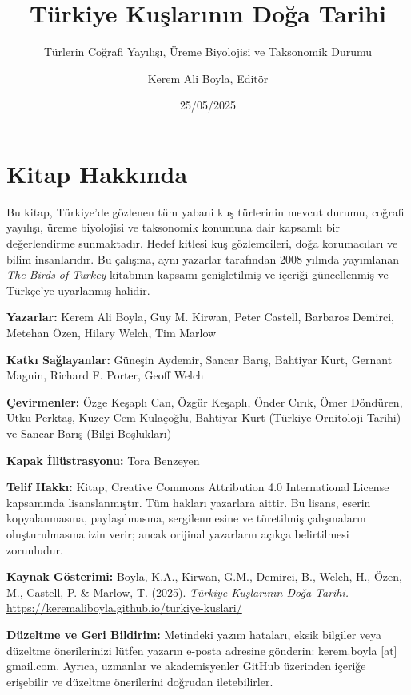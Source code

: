 \documentclass[
  10.5pt,
  a4paper,
  DIV=11,
  numbers=noendperiod,
  twocolumn]{scrreprt}
\title{Türkiye Kuşlarının Doğa Tarihi}
\subtitle{Türlerin Coğrafi Yayılışı, Üreme Biyolojisi ve Taksonomik
Durumu}
\author{Kerem Ali Boyla, Editör}
\date{25/05/2025}
\renewcommand*\contentsname{İçindekiler}
\newcommand\contentsname{İçindekiler}
\begin{document}
\maketitle

\renewcommand*\contentsname{İçindekiler}
{
\hypersetup{linkcolor=}
\setcounter{tocdepth}{2}
\tableofcontents
}


\chapter*{Kitap Hakkında}\label{kitap-hakkux131nda}


Bu kitap, Türkiye'de gözlenen tüm yabani kuş türlerinin mevcut durumu,
coğrafi yayılışı, üreme biyolojisi ve taksonomik konumuna dair kapsamlı
bir değerlendirme sunmaktadır. Hedef kitlesi kuş gözlemcileri, doğa
korumacıları ve bilim insanlarıdır. Bu çalışma, aynı yazarlar tarafından
2008 yılında yayımlanan \emph{The Birds of Turkey} kitabının kapsamı
genişletilmiş ve içeriği güncellenmiş ve Türkçe'ye uyarlanmış halidir.

\textbf{Yazarlar:} Kerem Ali Boyla, Guy M. Kirwan, Peter Castell,
Barbaros Demirci, Metehan Özen, Hilary Welch, Tim Marlow

\textbf{Katkı Sağlayanlar:} Güneşin Aydemir, Sancar Barış, Bahtiyar
Kurt, Gernant Magnin, Richard F. Porter, Geoff Welch

\textbf{Çevirmenler:} Özge Keşaplı Can, Özgür Keşaplı, Önder Cırık, Ömer
Döndüren, Utku Perktaş, Kuzey Cem Kulaçoğlu, Bahtiyar Kurt (Türkiye
Ornitoloji Tarihi) ve Sancar Barış (Bilgi Boşlukları)

\textbf{Kapak İllüstrasyonu:} Tora Benzeyen

\textbf{Telif Hakkı:} Kitap, Creative Commons Attribution 4.0
International License kapsamında lisanslanmıştır. Tüm hakları yazarlara
aittir. Bu lisans, eserin kopyalanmasına, paylaşılmasına, sergilenmesine
ve türetilmiş çalışmaların oluşturulmasına izin verir; ancak orijinal
yazarların açıkça belirtilmesi zorunludur.

\textbf{Kaynak Gösterimi:} Boyla, K.A., Kirwan, G.M., Demirci, B.,
Welch, H., Özen, M., Castell, P. \& Marlow, T. (2025). \emph{Türkiye
Kuşlarının Doğa Tarihi.}
\url{https://keremaliboyla.github.io/turkiye-kuslari/}

\textbf{Düzeltme ve Geri Bildirim:} Metindeki yazım hataları, eksik
bilgiler veya düzeltme önerilerinizi lütfen yazarın e-posta adresine
gönderin: kerem.boyla {[}at{]} gmail.com. Ayrıca, uzmanlar ve
akademisyenler GitHub üzerinden içeriğe erişebilir ve düzeltme
önerilerini doğrudan iletebilirler.
\end{document}
